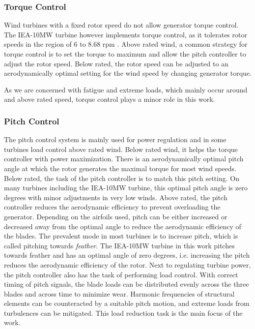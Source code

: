 \subsubsection{Torque Control}
Wind turbines with a fixed rotor speed do not allow generator torque control. The IEA-10MW turbine however implements torque control, as it tolerates rotor speeds in the region of 6 to 8.68 rpm \cite[Table 16]{bortolottiIEAWindTCP2019}. Above rated wind, a common strategy for torque control is to set the torque to maximum and allow the pitch controller to adjust the rotor speed. Below rated, the rotor speed can be adjusted to an aerodynamically optimal setting for the wind speed by changing generator torque. \cite[Chapter 8.2.3]{burtonWindEnergyHandbook2011}

As we are concerned with fatigue and extreme loads, which mainly occur around and above rated speed, torque control plays a minor role in this work.

\subsubsection{Pitch Control}

The pitch control system is mainly used for power regulation and in some turbines load control above rated wind. Below rated wind, it helps the torque controller with power maximization. There is an aerodynamically optimal pitch angle at which the rotor generates the maximal torque for most wind speeds. Below rated, the task of the pitch controller is to match this pitch setting. On many turbines including the IEA-10MW turbine, this optimal pitch angle is zero degrees with minor adjustments in very low winds. Above rated, the pitch controller reduces the aerodynamic efficiency to prevent overloading the generator. Depending on the airfoils used, pitch can be either increased or decreased away from the optimal angle to reduce the aerodynamic efficiency of the blades. The prevalent mode in most turbines is to increase pitch, which is called pitching towards \textit{feather}. The IEA-10MW turbine \cite[Table 17]{bortolottiIEAWindTCP2019} in this work pitches towards feather and has an optimal angle of zero degrees, i.e. increasing the pitch reduces the aerodynamic efficiency of the rotor. Next to regulating turbine power, the pitch controller also has the task of performing load control. With correct timing of pitch signals, the blade loads can be distributed evenly across the three blades and across time to minimize wear. Harmonic frequencies of structural elements can be counteracted by a suitable pitch motion, and extreme loads from turbulences can be mitigated. This load reduction task is the main focus of the work. \cite[Chapter 8.2.1]{burtonWindEnergyHandbook2011}

